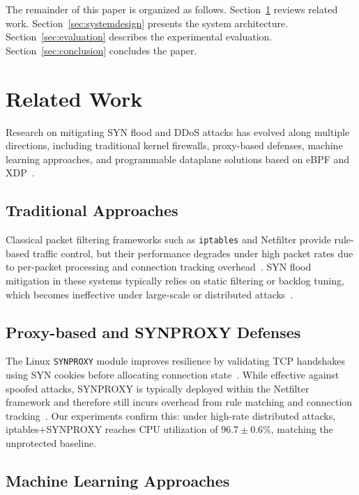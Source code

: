 \documentclass[conference]{IEEEtran}
\begin{document}
The remainder of this paper is organized as follows.
Section~\ref{sec:related} reviews related work.
Section~\ref{sec:systemdesign} presents the system architecture.
Section~\ref{sec:evaluation} describes the experimental evaluation.
Section~\ref{sec:conclusion} concludes the paper.

\section{Related Work}
\label{sec:related}

Research on mitigating SYN flood and DDoS attacks has evolved along
multiple directions, including traditional kernel firewalls, proxy-based
defenses, machine learning approaches, and programmable dataplane solutions
based on eBPF and XDP~\cite{SYNFloodSurvey}.

\subsection{Traditional Approaches}

Classical packet filtering frameworks such as \texttt{iptables} and
Netfilter provide rule-based traffic control, but their performance
degrades under high packet rates due to per-packet processing and
connection tracking overhead~\cite{NetfilterArch}.
SYN flood mitigation in these systems typically relies on static filtering
or backlog tuning, which becomes ineffective under large-scale or
distributed attacks~\cite{TahirPaper}.

\subsection{Proxy-based and SYNPROXY Defenses}

The Linux \texttt{SYNPROXY} module improves resilience by validating TCP
handshakes using SYN cookies before allocating connection
state~\cite{lwn_synproxy}.
While effective against spoofed attacks, SYNPROXY is typically deployed
within the Netfilter framework and therefore still incurs overhead from
rule matching and connection tracking~\cite{iptables_synproxy}.
Our experiments confirm this: under high-rate distributed attacks,
iptables+SYNPROXY reaches CPU utilization of $96.7 \pm 0.6$\%, matching
the unprotected baseline.

\subsection{Machine Learning Approaches}
\end{document}
